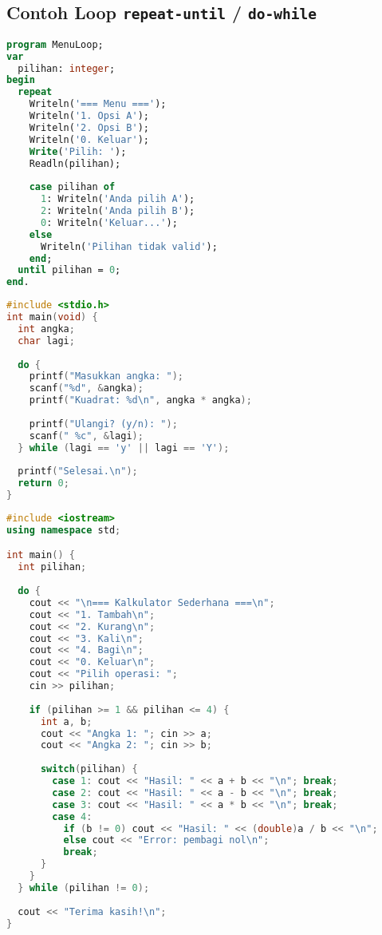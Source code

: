 \documentclass[../main.tex]{subfiles}
\begin{document}
\subsection{Contoh Loop \texttt{repeat-until} / \texttt{do-while}}
\begin{lstlisting}[language=Pascal, caption={Menu dengan repeat-until (Pascal)}]
program MenuLoop;
var
  pilihan: integer;
begin
  repeat
    Writeln('=== Menu ===');
    Writeln('1. Opsi A');
    Writeln('2. Opsi B');
    Writeln('0. Keluar');
    Write('Pilih: ');
    Readln(pilihan);
    
    case pilihan of
      1: Writeln('Anda pilih A');
      2: Writeln('Anda pilih B');
      0: Writeln('Keluar...');
    else
      Writeln('Pilihan tidak valid');
    end;
  until pilihan = 0;
end.
\end{lstlisting}

\begin{lstlisting}[language=C, caption={Input ulang dengan do-while (C)}]
#include <stdio.h>
int main(void) {
  int angka;
  char lagi;
  
  do {
    printf("Masukkan angka: ");
    scanf("%d", &angka);
    printf("Kuadrat: %d\n", angka * angka);
    
    printf("Ulangi? (y/n): ");
    scanf(" %c", &lagi);
  } while (lagi == 'y' || lagi == 'Y');
  
  printf("Selesai.\n");
  return 0;
}
\end{lstlisting}

\begin{lstlisting}[language=C++, caption={Validasi input dengan do-while (C++)}]
#include <iostream>
using namespace std;

int main() {
  int pilihan;
  
  do {
    cout << "\n=== Kalkulator Sederhana ===\n";
    cout << "1. Tambah\n";
    cout << "2. Kurang\n";
    cout << "3. Kali\n";
    cout << "4. Bagi\n";
    cout << "0. Keluar\n";
    cout << "Pilih operasi: ";
    cin >> pilihan;
    
    if (pilihan >= 1 && pilihan <= 4) {
      int a, b;
      cout << "Angka 1: "; cin >> a;
      cout << "Angka 2: "; cin >> b;
      
      switch(pilihan) {
        case 1: cout << "Hasil: " << a + b << "\n"; break;
        case 2: cout << "Hasil: " << a - b << "\n"; break;
        case 3: cout << "Hasil: " << a * b << "\n"; break;
        case 4: 
          if (b != 0) cout << "Hasil: " << (double)a / b << "\n";
          else cout << "Error: pembagi nol\n";
          break;
      }
    }
  } while (pilihan != 0);
  
  cout << "Terima kasih!\n";
}
\end{lstlisting}
\end{document}
